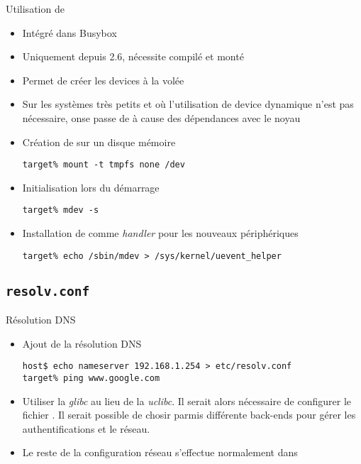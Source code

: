 \begin{frame}[fragile=singleslide]{Utilisation de }
  \begin{itemize}
  \item Intégré dans Busybox
  \item Uniquement depuis 2.6, nécessite  compilé et monté
  \item Permet de créer les devices à la volée
  \item Sur  les systèmes  très petits et  où l'utilisation  de device
    dynamique n'est  pas nécessaire, onse passe de   à cause
    des dépendances avec le noyau
  \item Création de  sur un disque mémoire
    \begin{lstlisting}
target% mount -t tmpfs none /dev
    \end{lstlisting}
  \item Initialisation  lors du démarrage
    \begin{lstlisting}
target% mdev -s
    \end{lstlisting}
  \item  Installation  de    comme \emph{handler}  pour  les
    nouveaux périphériques
    \begin{lstlisting}
target% echo /sbin/mdev > /sys/kernel/uevent_helper 
    \end{lstlisting}
  \end{itemize}
\end{frame}

\subsection{\texttt{resolv.conf}}

\begin{frame}[fragile=singleslide]{Résolution DNS}
  \begin{itemize}
  \item Ajout de la résolution DNS
    \begin{lstlisting}
host$ echo nameserver 192.168.1.254 > etc/resolv.conf
target% ping www.google.com
    \end{lstlisting}
  \item  Utiliser la  \emph{glibc}  au lieu  de  la \emph{uclibc}.  Il
    serait    alors    nécessaire    de    configurer    le    fichier
    .   Il  serait   possible  de   chosir  parmis
    différente  back-ends  pour  gérer  les  authentifications  et  le
    réseau.
  \item  Le reste  de la  configuration réseau  s'effectue normalement
    dans 
  \end{itemize}
\end{frame}

